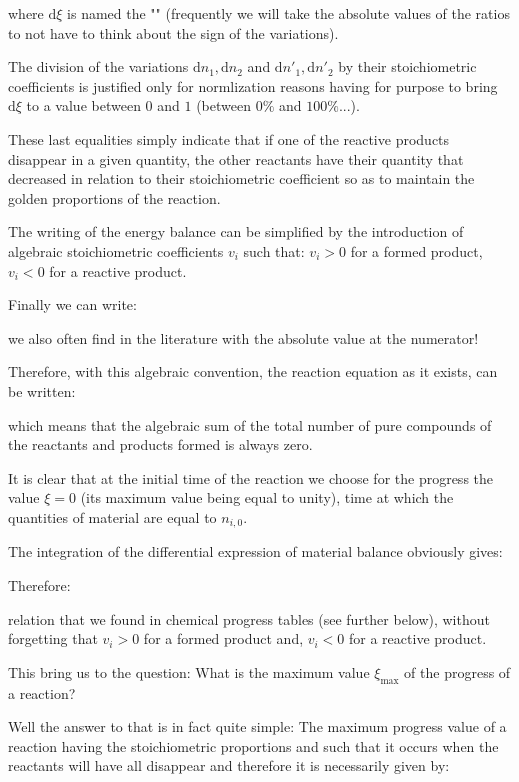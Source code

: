 	where $\mathrm{d}\xi$ is named the "" (frequently we will take the absolute values of the ratios to not have to think about the sign of the variations).
	
	The division of the variations $\mathrm{d}n_1,\mathrm{d}n_2$ and $\mathrm{d}{n'}_1,\mathrm{d}{n'}_2$  by their stoichiometric coefficients is justified only for normlization reasons having for purpose to bring $\mathrm{d}\xi$ to a value between $0$ and $1$ (between $0\%$ and $100\%$...).
	
	These last equalities simply indicate that if one of the reactive products disappear in a given quantity, the other reactants have their quantity that decreased in relation to their stoichiometric coefficient so as to maintain the golden proportions of the reaction.
	
		The writing of the energy balance can be simplified by the introduction of algebraic stoichiometric coefficients $v_i$ such that: $v_i>0$ for a formed product, $v_i<0$ for a reactive product.

	Finally we can write:
	
	we also often find in the literature with the absolute value at the numerator!

	Therefore, with this algebraic convention, the reaction equation as it exists, can be written:
	
	which means that the algebraic sum of the total number of pure compounds of the reactants and products formed is always zero.

	It is clear that at the initial time of the reaction we choose for the progress the value $\xi=0$ (its maximum value being equal to unity), time at which the quantities of material are equal to $n_{i,0}$.

	The integration of the differential expression of material balance obviously gives:
	
	Therefore:
	
	relation that we found in chemical progress tables (see further below), without forgetting that $v_i>0$ for a formed product and, $v_i<0$ for a reactive product.

	This bring us to the question: What is the maximum value $\xi_{\max}$ of the progress of a reaction? 

	Well the answer to that is in fact quite simple: The maximum progress value of a reaction having the stoichiometric proportions and such that it occurs when the reactants will have all disappear and therefore it is necessarily given by:
	
